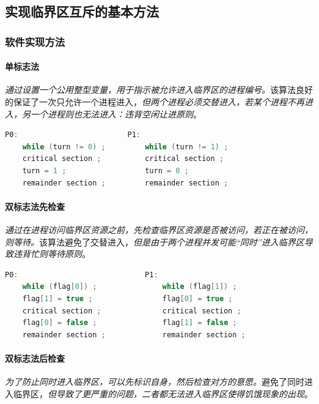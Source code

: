 \subsection{实现临界区互斥的基本方法}

\subsubsection{软件实现方法}

\paragraph{单标志法}

    \emph{通过设置一个公用整型变量，用于指示被允许进入临界区的进程编号。}该算法良好的保证了一次只允许一个进程进入，\emph{\color{red}但两个进程必须交替进入，若某个进程不再进入，另一个进程则也无法进入：违背空闲让进原则}。

\begin{lstlisting}[language=C++]
P0:                         P1:
    while (turn != 0) ;         while (turn != 1) ;
    critical section ;          critical section ;
    turn = 1 ;                  turn = 0 ;
    remainder section ;         remainder section ;
\end{lstlisting}

\paragraph{双标志法先检查}

    \emph{通过在进程访问临界区资源之前，先检查临界区资源是否被访问，若正在被访问，则等待。}该算法避免了交替进入，\emph{但是由于两个进程并发可能“同时”进入临界区导致违背忙则等待原则}。

\begin{lstlisting}[language=C++]
P0:                             P1:
    while (flag[0]) ;               while (flag[1]) ;
    flag[1] = true ;                flag[0] = true ;
    critical section ;              critical section ;
    flag[0] = false ;               flag[1] = false ;
    remainder section ;             remainder section ;
\end{lstlisting}

\paragraph{双标志法后检查}

    \emph{为了防止同时进入临界区，可以先标识自身，然后检查对方的意愿。}避免了同时进入临界区，\emph{但导致了更严重的问题，二者都无法进入临界区使得\color{red}饥饿现象的出现}。

